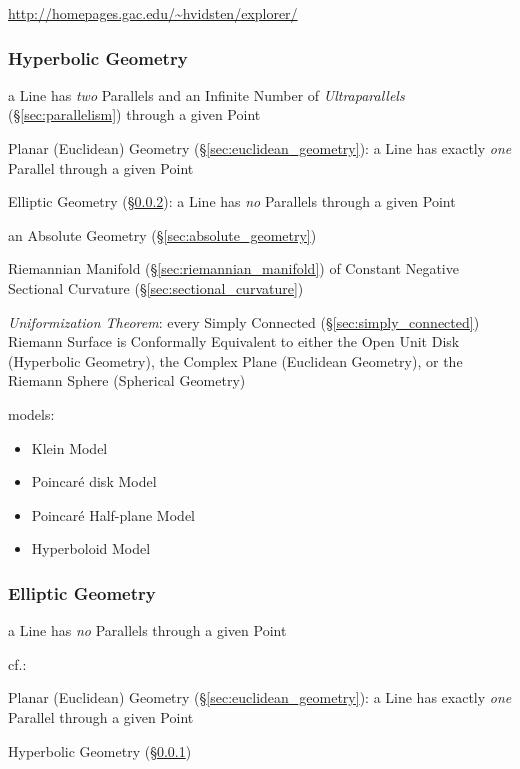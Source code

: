 \url{http://homepages.gac.edu/~hvidsten/explorer/}



\subsubsection{Hyperbolic Geometry}\label{sec:hyperbolic_geometry}

a Line has \emph{two} Parallels and an Infinite Number of \emph{Ultraparallels}
(\S\ref{sec:parallelism}) through a given Point

\fist Planar (Euclidean) Geometry (\S\ref{sec:euclidean_geometry}): a Line has
  exactly \emph{one} Parallel through a given Point

\fist Elliptic Geometry (\S\ref{sec:elliptic_geometry}): a Line has \emph{no}
  Parallels through a given Point

an Absolute Geometry (\S\ref{sec:absolute_geometry})


Riemannian Manifold (\S\ref{sec:riemannian_manifold}) of Constant Negative
Sectional Curvature (\S\ref{sec:sectional_curvature})

\emph{Uniformization Theorem}: every Simply Connected
(\S\ref{sec:simply_connected}) Riemann Surface is Conformally Equivalent to
either the Open Unit Disk (Hyperbolic Geometry), the Complex Plane (Euclidean
Geometry), or the Riemann Sphere (Spherical Geometry)

models:
\begin{itemize}
  \item Klein Model
  \item Poincar\'e disk Model
  \item Poincar\'e Half-plane Model
  \item Hyperboloid Model
\end{itemize}



\subsubsection{Elliptic Geometry}\label{sec:elliptic_geometry}

a Line has \emph{no} Parallels through a given Point

cf.:

\fist Planar (Euclidean) Geometry (\S\ref{sec:euclidean_geometry}): a Line has
exactly \emph{one} Parallel through a given Point

\fist Hyperbolic Geometry (\S\ref{sec:hyperbolic_geometry})

